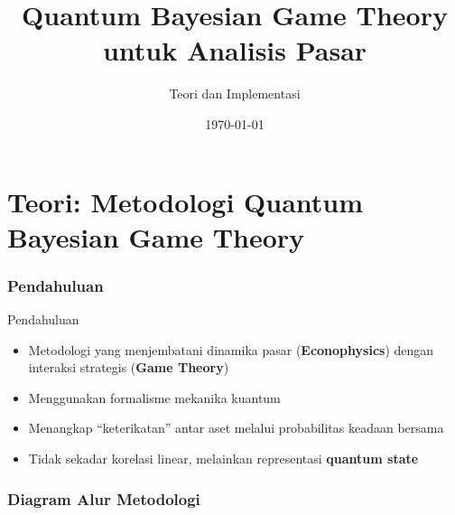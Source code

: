 \documentclass[aspectratio=169]{beamer}
\title{Quantum Bayesian Game Theory untuk Analisis Pasar}
\subtitle{Teori dan Implementasi}
\date{\today}
\begin{document}
\begin{frame}
    \titlepage
\end{frame}


\part{Teori: Metodologi Quantum Bayesian Game Theory}
\frame{\partpage}

\section{Pendahuluan}

\begin{frame}{Pendahuluan}
    \begin{itemize}
        \item Metodologi yang menjembatani dinamika pasar (\textbf{Econophysics}) dengan interaksi strategis (\textbf{Game Theory})
        \item Menggunakan formalisme mekanika kuantum
        \item Menangkap ``keterikatan'' antar aset melalui probabilitas keadaan bersama
        \item Tidak sekadar korelasi linear, melainkan representasi \textbf{quantum state}
    \end{itemize}
\end{frame}

\section{Diagram Alur Metodologi}
\end{document}
